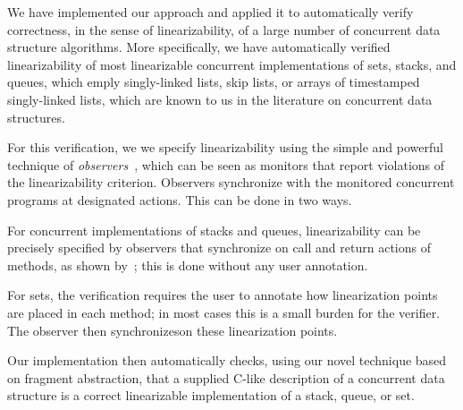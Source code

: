 
We have implemented our approach and applied it to automatically verify
correctness, in the sense of linearizability, of a large number of
concurrent data structure algorithms.
More specifically, we have automatically verified linearizability of 
most linearizable concurrent implementations
of sets, stacks, and queues, which emply singly-linked lists, skip lists, or
arrays of timestamped singly-linked lists, which are known to us in
the literature on concurrent data structures.

For this verification, we we specify linearizability
using the simple and powerful technique of
{\em observers}~\cite{AHHR:integrated}, which can be seen as monitors that
report violations of the linearizability criterion. Observers synchronize with
the monitored concurrent programs at designated actions. This can be done in
two ways.
\begin{inparaenum}[(1)]
\item
  For concurrent implementations of stacks and queues,
  linearizability can be precisely specified by
  observers that synchronize on call and return actions of
  methods, as shown by~\cite{BEEH:icalp15,HSV:concur13}; this is done without
 any user annotation.
\item
  For sets, the verification requires the user to annotate how linearization
  points are placed in each method; in most cases this is a small burden for
  the verifier. The observer then synchronizeson these 
  linearization points.
\end{inparaenum}
Our implementation then automatically checks, using our novel technique based on
fragment abstraction, that a supplied C-like description of a concurrent data structure is a correct linearizable implementation of a stack, queue, or set.

